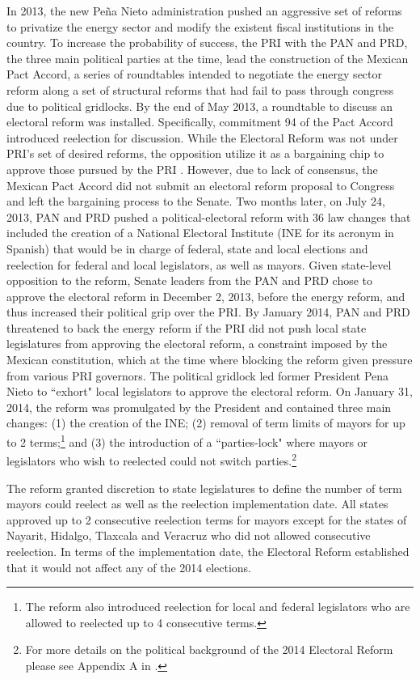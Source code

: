 \documentclass[12pt]{amsart}
\numberwithin{equation}{section}
\theoremstyle{definition}
\theoremstyle{definition}
\theoremstyle{definition}
\begin{document}
In 2013, the new Peña Nieto administration pushed an aggressive set of reforms to privatize the energy sector and modify the existent fiscal institutions in the country. To increase the probability of success, the PRI with the PAN and PRD, the three main political parties at the time, lead the construction of the Mexican Pact Accord, a series of roundtables intended to negotiate the energy sector reform along a set of structural reforms that had fail to pass through congress due to political gridlocks. By the end of May 2013, a roundtable to discuss an electoral reform was installed. Specifically, commitment 94 of the Pact Accord introduced reelection for discussion. While the Electoral Reform was not under PRI's set of desired reforms, the opposition utilize it as a bargaining chip to approve those pursued by the PRI \citep{zamitiz_2017}. However, due to lack of consensus, the Mexican Pact Accord did not submit an electoral reform proposal to Congress and left the bargaining process to the Senate. Two months later, on July 24, 2013, PAN and PRD pushed a political-electoral reform with 36 law changes that included  the creation of a National Electoral Institute (INE for its acronym in Spanish) that would be in charge of federal, state and local elections and reelection for federal and local legislators, as well as mayors. Given state-level opposition to the reform, Senate leaders from the PAN and PRD chose to approve the electoral reform in December 2, 2013, before the energy reform, and thus increased their political grip over the PRI. By January 2014, PAN and PRD threatened to back the energy reform  if the PRI did not push local state legislatures from approving the electoral reform, a constraint imposed by the Mexican constitution, which at the time where blocking the reform given pressure from various PRI governors. The political gridlock led former President Pena Nieto to ``exhort" local legislators to approve the electoral reform. On January 31, 2014, the reform was promulgated by the President and contained three main changes: (1) the creation of the INE; (2) removal of term limits of mayors for up to 2 terms;\footnote{The reform also introduced reelection for local and federal legislators who are allowed to reelected up to 4 consecutive terms.} and (3) the introduction of a ``parties-lock"	where mayors or legislators who wish to reelected could not switch parties.\footnote{For more details on the political background of the 2014 Electoral Reform please see Appendix A in \citet{ch_2021}.}

The reform granted discretion to state legislatures to define the number of term mayors could reelect as well as the reelection implementation date. All states approved up to 2 consecutive reelection terms for mayors except for the states of Nayarit, Hidalgo, Tlaxcala and Veracruz who did not allowed consecutive reelection. In terms of the implementation date, the Electoral Reform established that it would not affect any of the 2014 elections. 
\end{document}
